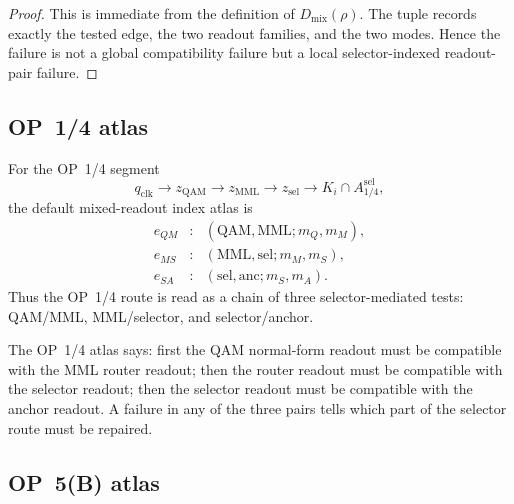 \begin{proof}
This is immediate from the definition of \(D_{\mathrm{mix}}(\rho)\). The
tuple records exactly the tested edge, the two readout families, and the two
modes. Hence the failure is not a global compatibility failure but a local
selector-indexed readout-pair failure.
\end{proof}

\subsection{OP~1/4 atlas}
\label{subsec:v410r19-op14-atlas}

\begin{definition}
\label{def:v410r19-op14-mixed-readout-index-atlas}
For the OP~1/4 segment
\[
 q_{\mathrm{clk}}\to z_{\mathrm{QAM}}\to z_{\mathrm{MML}}\to
 z_{\mathrm{sel}}\to K_i\cap A_{1/4}^{\mathrm{sel}},
\]
the default mixed-readout index atlas is
\[
\begin{array}{ccl}
e_{QM} &:& (\mathrm{QAM},\mathrm{MML};m_Q,m_M),\\
e_{MS} &:& (\mathrm{MML},\mathrm{sel};m_M,m_S),\\
e_{SA} &:& (\mathrm{sel},\mathrm{anc};m_S,m_A).
\end{array}
\]
Thus the OP~1/4 route is read as a chain of three selector-mediated tests:
QAM/MML, MML/selector, and selector/anchor.
\end{definition}

\begin{remark}
\label{rem:v410r19-human-reading-op14-atlas}
The OP~1/4 atlas says: first the QAM normal-form readout must be compatible
with the MML router readout; then the router readout must be compatible with
the selector readout; then the selector readout must be compatible with the
anchor readout. A failure in any of the three pairs tells which part of the
selector route must be repaired.
\end{remark}

\subsection{OP~5(B) atlas}
\label{subsec:v410r19-op5b-atlas}

